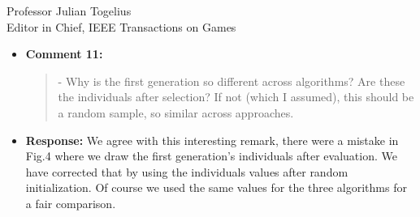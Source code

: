 \documentclass[10pt]{letter} %
\begin{document}
\begin{letter}{Professor Julian Togelius \\ Editor in Chief, IEEE Transactions on Games}
\begin{enumerate}
\begin{itemize}
indicates that we got rid of the ``cheating'' individuals, with mode
higher than the median, obtaining a result that is more robuts than
with a negative skewness. Most important thing, however, is the fact
that the value is not too high, and that is reduced through the
evolution and the application of our methodology. Obtaining ``very
bad'' controllers (or outliers) is rather the consequence of the
kurtosis. A low kurtosis would lower the probability of those
outliers. We have added a statement in the future work area, since in
this paper investigating this does not really fall within its focus.
			\item {\bf Comment 11:}
				\begin{quote}	
					- Why is the first generation so different across algorithms? Are these the individuals after selection? If not (which I assumed), this should be a random sample, so similar across approaches.
				\end{quote}	
			\item {\bf Response:} 
			We agree with this interesting remark, there
                        were a mistake in Fig.4 where we draw the
                        first generation's individuals after
                        evaluation. We have corrected that by using
                        the individuals values after random
                        initialization. Of course we used the same
                        values for the three algorithms for a fair
                        comparison.


\end{itemize}
\end{enumerate}
\end{letter}
\end{document}
